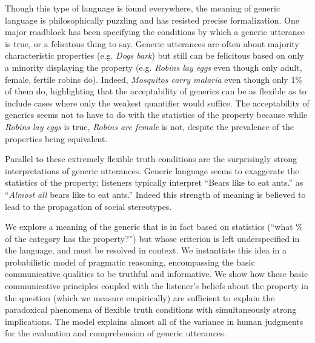 \documentclass[11pt,stdletter,dateno,sigleft]{newlfm} %
\begin{document}
\begin{newlfm}
Though this type of language is found everywhere, the meaning of generic language is philosophically puzzling and has resisted precise formalization. 
One major roadblock has been specifying the conditions by which a generic utterance is true, or a felicitous thing to say.
Generic utterances are often about majority characteristic properties (e.g. \emph{Dogs bark}) but still can be felicitous based on only a minority displaying the property (e.g. \emph{Robins lay eggs} even though only adult, female, fertile robins do). 
Indeed, \emph{Mosquitos carry malaria} even though only 1\% of them do, highlighting that the acceptability of generics can be as flexible as to include cases where only the weakest quantifier would suffice. 
The acceptability of generics seems not to have to do with the statistics of the property because while \emph{Robins lay eggs} is true, \emph{Robins are female} is not, despite the prevalence of the properties being equivalent. 

Parallel to these extremely flexible truth conditions are the surprisingly strong interpretations of generic utterances.
Generic language seems to exaggerate the statistics of the property; listeners typically interpret ``Bears like to eat ants.'' as ``\emph{Almost all} bears like to eat ants.''
Indeed this strength of meaning is believed to lead to the propagation of social stereotypes. 


% 

We explore a meaning of the generic that is in fact based on statistics (``what \% of the category has the property?'') but 
whose criterion is left underspecified in the language, and must be resolved in context.
We instantiate this idea in a probabilistic model of pragmatic reasoning, encompassing the basic communicative qualities to be truthful and informative. 
We show how these basic communicative principles coupled with the listener's beliefs about the property in the question (which we measure empirically) are sufficient to explain the paradoxical phenomena of flexible truth conditions with simultaneously strong implications.
The model explains almost all of the variance in human judgments for the evaluation and comprehension of generic utterances.


\end{newlfm}
\end{document}
